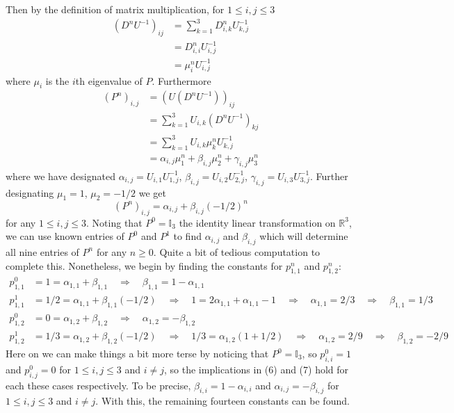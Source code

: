 \documentclass[11pt, letterpaper]{article}
\newcommand{\mbb}[1]{\mathbb{#1}}
\begin{document}
    Then by the definition of matrix multiplication, for $1\leq i,j\leq 3$
    \begin{align*}
        (D^nU^{-1})_{ij}&=\sum_{k=1}^3D^n_{i,k}U^{-1}_{k,j}\\
        &=D^n_{i,i}U^{-1}_{i,j}\tag{since $D$ diagonal}\\
        &=\mu_i^nU_{i,j}^{-1}
    \end{align*}
    where $\mu_i$ is the $i$th eigenvalue of $P$. Furthermore
    \begin{align*}
        (P^n)_{i,j}&=(U(D^nU^{-1}))_{ij}\\
        &=\sum_{k=1}^3U_{i,k}(D^nU^{-1})_{kj}\\
        &=\sum_{k=1}^3U_{i,k}\mu^n_kU^{-1}_{k,j}\\
        &=\alpha_{i,j}\mu_1^n+\beta_{i,j}\mu_2^n+\gamma_{i,j}\mu_3^n
    \end{align*}
    where we have designated $\alpha_{i,j}=U_{i,1}U^{-1}_{1,j}$, $\beta_{i,j}=U_{i,2}U^{-1}_{2,j}$, $\gamma_{i,j}=U_{i,3}U^{-1}_{3,j}$. Further designating $\mu_1=1$, $\mu_2=-1/2$ we get
    \[(P^n)_{i,j}=\alpha_{i,j}+\beta_{i,j}(-1/2)^n\]
    for any $1\leq i,j\leq 3$. Noting that $P^0=\mbb{I}_3$ the identity linear transformation on $\mbb{R}^3$, we can use known entries of $P^0$ and $P^1$ to find $\alpha_{i,j}$ and $\beta_{i,j}$
    which will determine all nine entries of $P^n$ for any $n\geq 0$. Quite a bit of tedious computation to complete this. Nonetheless, we begin by finding the constants for $p_{1,1}^n$ and $p_{1,2}^n$:
    \begin{align*}
        p^0_{1,1}&=1=\alpha_{1,1}+\beta_{1,1}\quad\Rightarrow\quad\beta_{1,1}=1-\alpha_{1,1}\tag{6}\\
        p_{1,1}^1&=1/2=\alpha_{1,1}+\beta_{1,1}(-1/2)\quad\Rightarrow\quad 1=2\alpha_{1,1}+\alpha_{1,1}-1\quad\Rightarrow\quad \alpha_{1,1}=2/3\quad\Rightarrow\quad \beta_{1,1}=1/3\\[10pt]
        p_{1,2}^0&=0=\alpha_{1,2}+\beta_{1,2}\quad\Rightarrow\quad \alpha_{1,2}=-\beta_{1,2}\tag{7}\\
        p_{1,2}^1&=1/3=\alpha_{1,2}+\beta_{1,2}(-1/2)\quad\Rightarrow\quad 1/3=\alpha_{1,2}(1+1/2)\quad\Rightarrow\quad\alpha_{1,2}=2/9\quad\Rightarrow\quad\beta_{1,2}=-2/9
    \end{align*}
    Here on we can make things a bit more terse by noticing that $P^0=\mbb{I}_3$, so $p^0_{i,i}=1$ and $p^0_{i,j}=0$ for $1\leq i,j\leq 3$ and $i\neq j$, so the implications in (6) and (7) hold
    for each these cases respectively. To be precise, $\beta_{i,i}=1-\alpha_{i,i}$ and $\alpha_{i,j}=-\beta_{i,j}$ for $1\leq i,j\leq 3$ and $i\neq j$. With this, the remaining fourteen constants can be found.
\end{document}
